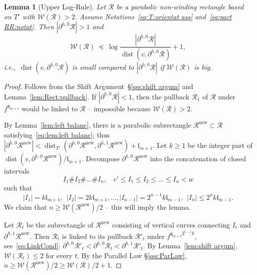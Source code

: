 \documentclass{amsart}
\renewcommand{\sp}{{\ \ }}
\newcommand{\1}{{\mathbb 1 }}
\newcommand{\Width}{{\mathcal W}}
\newcommand\RR{\mathcal{R}}
\newcommand{\qq}{\mathfrak{q}}
\newcommand{\length}{{\mathfrak l}}
\newcommand\new{{\operatorname{new}}}
\newtheorem{lem}[thm]{Lemma}
\theoremstyle{remark}
\numberwithin{equation}{section}
\theoremstyle{definition}
\newcommand{\dist}{\operatorname{dist}}
\begin{document}
\begin{lem}[Upper Log-Rule]
\label{lem:contr:part^h,1}
Let $\RR$ be a parabolic non-winding rectangle based on $T'$ with $\Width(\RR)>2$. Assume Notations~\eqref{eq:T:orientat ass} and~\eqref{eq:part RR:notat}. Then  $|\partial^{h,0}\RR|>  1$ and
\begin{equation}
\label{eq:lem:contr:part^h,1}
\Width(\RR) \ \preceq\  \log \frac{|\partial^{h,0}\RR |}{\dist(v, \partial^{h,0}\RR)} +1,
\end{equation} 
i.e.,~$\dist(v, \partial^{h,0}\RR) $ is small compared to $|\partial^{h,0}\RR|$ if $\Width(\RR)$ is big.
\end{lem}
\begin{proof}
Follows from the Shift Argument~\S\ref{sss:shift argum} and Lemma~\ref{lem:Rect:pullback}. If $|\partial^{h,0}\RR|< 1$, then the pullback $\RR_1$ of $\RR$ under $f^{\qq_{m+1}}$ would be linked to $\RR$ -- impossible because $\Width(\RR)>2$.


By Lemma~\ref{lem:left balanc}, there is a parabolic subrectangle  $\RR^\new\subset \RR$ satisfying~\eqref{eq:lem:left balanc}; thus $|\partial^{h,0}\RR^\new|<\dist_{T'}(\partial^{h,0}\RR^\new,\partial^{h,1}\RR^\new)+\length_{m+1}$. Let $k\ge 1$ be the integer part of $\dist(v,\partial^{h,0}\RR^\new )/\length_{m+1}$. Decompose $\partial^{h,0}\RR^\new$ into the concatenation of closed intervals \[I_1\#I_2\#\dots \# I_n, \sp\sp v'\le I_1\le I_2\le \dots \le I_n<w\]
such that \[ |I_1|=k\length_{m+1},\sp |I_2|=2k\length_{m+1}, \dots , |I_{n-1}|=2^{n-1}k \length_{m-1}, \sp |I_{n}|\le 2^{n}k \length_{m-1}.\]
We claim that $n\ge \Width(\RR^\new)/2$ -- this will imply the lemma.

Let $\RR_t$ be the subrectangle of $\RR^\new$ consisting of vertical curves connecting $I_t$ and $\partial^{h,1} \RR^\new$. Then $\RR_t$ is linked to its pullback $\RR'_t$ under $f^{\qq_{m+1} 2^{t-1} k}$, see~\eqref{eq:LinkCond}: $ \partial ^{h,0} \RR'_t < \partial^{h,0} \RR_t < \partial ^{h,1} \RR'_t.$ By Lemma~\ref{lem:shift argum}, $\Width(\RR_t)\le 2$ for every $t$. By the Parallel Law \S\ref{sss:ParLaw},  $n\ge \Width(\RR^\new)/2\ge \Width(\RR)/2+1$.
\end{proof}
\end{document}
